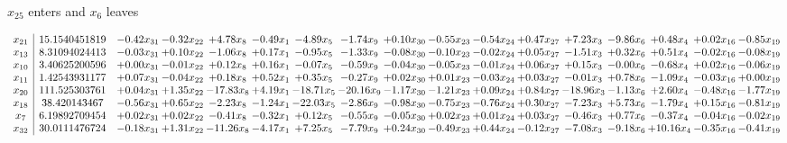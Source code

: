 \documentclass[9pt]{article}
\begin{document}
 $ x_{25} $ enters and $ x_{6} $ leaves 

 \[\begin{array}{c| c c@{\hskip 2pt} c@{\hskip 2pt} c@{\hskip 2pt} c@{\hskip 2pt} c@{\hskip 2pt} c@{\hskip 2pt} c@{\hskip 2pt} c@{\hskip 2pt} c@{\hskip 2pt} c@{\hskip 2pt} c@{\hskip 2pt} c@{\hskip 2pt} c@{\hskip 2pt} c@{\hskip 2pt} c@{\hskip 2pt} }
 x_{21}   &  15.1540451819 & -0.42 x_{31} & -0.32 x_{22} & +  4.78 x_{8} & -0.49 x_{1} & -4.89 x_{5} & -1.74 x_{9} & +  0.10 x_{30} & -0.55 x_{23} & -0.54 x_{24} & +  0.47 x_{27} & +  7.23 x_{3} & -9.86 x_{6} & +  0.48 x_{4} & +  0.02 x_{16} & -0.85 x_{19}\\
 x_{13}   &  8.31094024413 & -0.03 x_{31} & +  0.10 x_{22} & -1.06 x_{8} & +  0.17 x_{1} & -0.95 x_{5} & -1.33 x_{9} & -0.08 x_{30} & -0.10 x_{23} & -0.02 x_{24} & +  0.05 x_{27} & -1.51 x_{3} & +  0.32 x_{6} & +  0.51 x_{4} & -0.02 x_{16} & -0.08 x_{19}\\
 x_{10}   &  3.40625200596 & +  0.00 x_{31} & -0.01 x_{22} & +  0.12 x_{8} & +  0.16 x_{1} & -0.07 x_{5} & -0.59 x_{9} & -0.04 x_{30} & -0.05 x_{23} & -0.01 x_{24} & +  0.06 x_{27} & +  0.15 x_{3} & -0.00 x_{6} & -0.68 x_{4} & +  0.02 x_{16} & -0.06 x_{19}\\
 x_{11}   &  1.42543931177 & +  0.07 x_{31} & -0.04 x_{22} & +  0.18 x_{8} & +  0.52 x_{1} & +  0.35 x_{5} & -0.27 x_{9} & +  0.02 x_{30} & +  0.01 x_{23} & -0.03 x_{24} & +  0.03 x_{27} & -0.01 x_{3} & +  0.78 x_{6} & -1.09 x_{4} & -0.03 x_{16} & +  0.00 x_{19}\\
 x_{20}   &  111.525303761 & +  0.04 x_{31} & +  1.35 x_{22} & -17.83 x_{8} & +  4.19 x_{1} & -18.71 x_{5} & -20.16 x_{9} & -1.17 x_{30} & -1.21 x_{23} & +  0.09 x_{24} & +  0.84 x_{27} & -18.96 x_{3} & -1.13 x_{6} & +  2.60 x_{4} & -0.48 x_{16} & -1.77 x_{19}\\
 x_{18}   &  38.420143467 & -0.56 x_{31} & +  0.65 x_{22} & -2.23 x_{8} & -1.24 x_{1} & -22.03 x_{5} & -2.86 x_{9} & -0.98 x_{30} & -0.75 x_{23} & -0.76 x_{24} & +  0.30 x_{27} & -7.23 x_{3} & +  5.73 x_{6} & -1.79 x_{4} & +  0.15 x_{16} & -0.81 x_{19}\\
 x_{7}   &  6.19892709454 & +  0.02 x_{31} & +  0.02 x_{22} & -0.41 x_{8} & -0.32 x_{1} & +  0.12 x_{5} & -0.55 x_{9} & -0.05 x_{30} & +  0.02 x_{23} & +  0.01 x_{24} & +  0.03 x_{27} & -0.46 x_{3} & +  0.77 x_{6} & -0.37 x_{4} & -0.04 x_{16} & -0.02 x_{19}\\
 x_{32}   &  30.0111476724 & -0.18 x_{31} & +  1.31 x_{22} & -11.26 x_{8} & -4.17 x_{1} & +  7.25 x_{5} & -7.79 x_{9} & +  0.24 x_{30} & -0.49 x_{23} & +  0.44 x_{24} & -0.12 x_{27} & -7.08 x_{3} & -9.18 x_{6} & + 10.16 x_{4} & -0.35 x_{16} & -0.41 x_{19}\\

\end{array}\]
\end{document}
